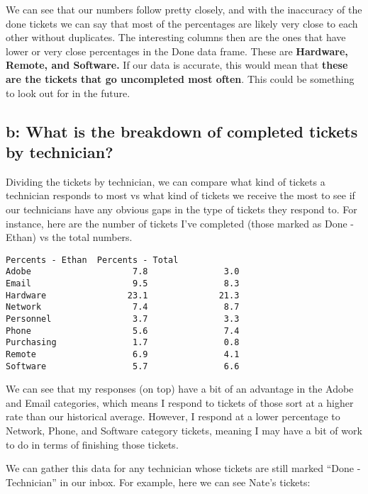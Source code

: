 \documentclass[11pt]{article}
\begin{document}
    We can see that our numbers follow pretty closely, and with the
inaccuracy of the done tickets we can say that most of the percentages
are likely very close to each other without duplicates. The interesting
columns then are the ones that have lower or very close percentages in
the Done data frame. These are \textbf{Hardware, Remote, and Software.}
If our data is accurate, this would mean that \textbf{these are the
tickets that go uncompleted most often}. This could be something to look
out for in the future.

    \hypertarget{b-what-is-the-breakdown-of-completed-tickets-by-technician}{%
\subsection{b: What is the breakdown of completed tickets by
technician?}\label{b-what-is-the-breakdown-of-completed-tickets-by-technician}}


    Dividing the tickets by technician, we can compare what kind of tickets
a technician responds to most vs what kind of tickets we receive the
most to see if our technicians have any obvious gaps in the type of
tickets they respond to. For instance, here are the number of tickets
I've completed (those marked as Done - Ethan) vs the total numbers.


    \begin{Verbatim}[commandchars=\\\{\}]
            Percents - Ethan  Percents - Total
Adobe                    7.8               3.0
Email                    9.5               8.3
Hardware                23.1              21.3
Network                  7.4               8.7
Personnel                3.7               3.3
Phone                    5.6               7.4
Purchasing               1.7               0.8
Remote                   6.9               4.1
Software                 5.7               6.6
    \end{Verbatim}

    We can see that my responses (on top) have a bit of an advantage in the
Adobe and Email categories, which means I respond to tickets of those
sort at a higher rate than our historical average. However, I respond at
a lower percentage to Network, Phone, and Software category tickets,
meaning I may have a bit of work to do in terms of finishing those
tickets.

    We can gather this data for any technician whose tickets are still
marked ``Done - Technician'' in our inbox. For example, here we can see
Nate's tickets:
\end{document}
